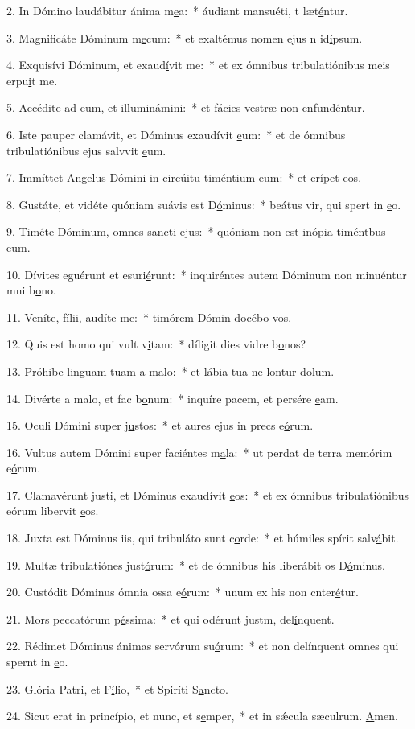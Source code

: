 2. In Dómino laudábitur ánima m\uline{e}a:~* áudiant mansuéti, t læt\uline{é}ntur.\par 
3. Magnificáte Dóminum m\uline{e}cum:~* et exaltémus nomen ejus n id\uline{í}psum.\par 
4. Exquisívi Dóminum, et exaud\uline{í}vit me:~* et ex ómnibus tribulatiónibus meis erpu\uline{i}t me.\par 
5. Accédite ad eum, et illumin\uline{á}mini:~* et fácies vestræ non cnfund\uline{é}ntur.\par 
6. Iste pauper clamávit, et Dóminus exaudívit \uline{e}um:~* et de ómnibus tribulatiónibus ejus salvvit \uline{e}um.\par 
7. Immíttet Angelus Dómini in circúitu timéntium \uline{e}um:~* et erípet \uline{e}os.\par 
8. Gustáte, et vidéte quóniam suávis est D\uline{ó}minus:~* beátus vir, qui spert in \uline{e}o.\par 
9. Timéte Dóminum, omnes sancti \uline{e}jus:~* quóniam non est inópia timéntbus \uline{e}um.\par 
10. Dívites eguérunt et esuri\uline{é}runt:~* inquiréntes autem Dóminum non minuéntur mni b\uline{o}no.\par 
11. Veníte, fílii, aud\uline{í}te me:~* timórem Dómin doc\uline{é}bo vos.\par 
12. Quis est homo qui vult v\uline{i}tam:~* díligit dies vidre b\uline{o}nos?\par 
13. Próhibe linguam tuam a m\uline{a}lo:~* et lábia tua ne lontur d\uline{o}lum.\par 
14. Divérte a malo, et fac b\uline{o}num:~* inquíre pacem, et persére \uline{e}am.\par 
15. Oculi Dómini super j\uline{u}stos:~* et aures ejus in precs e\uline{ó}rum.\par 
16. Vultus autem Dómini super faciéntes m\uline{a}la:~* ut perdat de terra memórim e\uline{ó}rum.\par 
17. Clamavérunt justi, et Dóminus exaudívit \uline{e}os:~* et ex ómnibus tribulatiónibus eórum libervit \uline{e}os.\par 
18. Juxta est Dóminus iis, qui tribuláto sunt c\uline{o}rde:~* et húmiles spírit salv\uline{á}bit.\par 
19. Multæ tribulatiónes just\uline{ó}rum:~* et de ómnibus his liberábit os D\uline{ó}minus.\par 
20. Custódit Dóminus ómnia ossa e\uline{ó}rum:~* unum ex his non cnter\uline{é}tur.\par 
21. Mors peccatórum p\uline{é}ssima:~* et qui odérunt justm, del\uline{í}nquent.\par 
22. Rédimet Dóminus ánimas servórum su\uline{ó}rum:~* et non delínquent omnes qui spernt in \uline{e}o.\par 
23. Glória Patri, et F\uline{í}lio,~* et Spiríti S\uline{a}ncto.\par 
24. Sicut erat in princípio, et nunc, et s\uline{e}mper,~* et in sǽcula sæculrum. \uline{A}men.\par 
